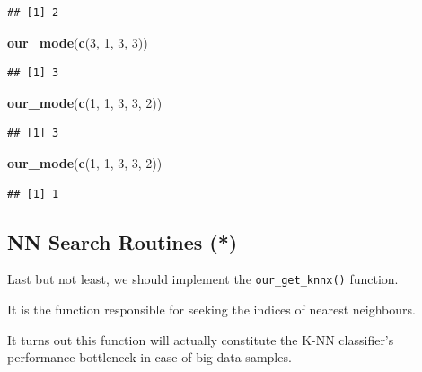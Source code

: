 \documentclass[10pt,b5paper,krantz1]{krantz}
\newenvironment{Shaded}{\begin{snugshade}}{\end{snugshade}}
\newcommand{\DecValTok}[1]{\textcolor[rgb]{0.06,0.06,0.06}{#1}}
\newcommand{\KeywordTok}[1]{\textcolor[rgb]{0.27,0.27,0.27}{\textbf{#1}}}
\newcommand{\NormalTok}[1]{#1}
\begin{document}
\begin{verbatim}
## [1] 2
\end{verbatim}

\begin{Shaded}
\begin{Highlighting}[]
\KeywordTok{our_mode}\NormalTok{(}\KeywordTok{c}\NormalTok{(}\DecValTok{3}\NormalTok{, }\DecValTok{1}\NormalTok{, }\DecValTok{3}\NormalTok{, }\DecValTok{3}\NormalTok{))}
\end{Highlighting}
\end{Shaded}

\begin{verbatim}
## [1] 3
\end{verbatim}

\begin{Shaded}
\begin{Highlighting}[]
\KeywordTok{our_mode}\NormalTok{(}\KeywordTok{c}\NormalTok{(}\DecValTok{1}\NormalTok{, }\DecValTok{1}\NormalTok{, }\DecValTok{3}\NormalTok{, }\DecValTok{3}\NormalTok{, }\DecValTok{2}\NormalTok{))}
\end{Highlighting}
\end{Shaded}

\begin{verbatim}
## [1] 3
\end{verbatim}

\begin{Shaded}
\begin{Highlighting}[]
\KeywordTok{our_mode}\NormalTok{(}\KeywordTok{c}\NormalTok{(}\DecValTok{1}\NormalTok{, }\DecValTok{1}\NormalTok{, }\DecValTok{3}\NormalTok{, }\DecValTok{3}\NormalTok{, }\DecValTok{2}\NormalTok{))}
\end{Highlighting}
\end{Shaded}

\begin{verbatim}
## [1] 1
\end{verbatim}

\hypertarget{nn-search-routines}{%
\subsection{NN Search Routines (*)}\label{nn-search-routines}}

Last but not least, we should implement the \texttt{our\_get\_knnx()} function.

It is the function responsible for seeking the indices of nearest neighbours.

It turns out this function will actually constitute the K-NN classifier's performance
bottleneck in case of big data samples.
\end{document}
